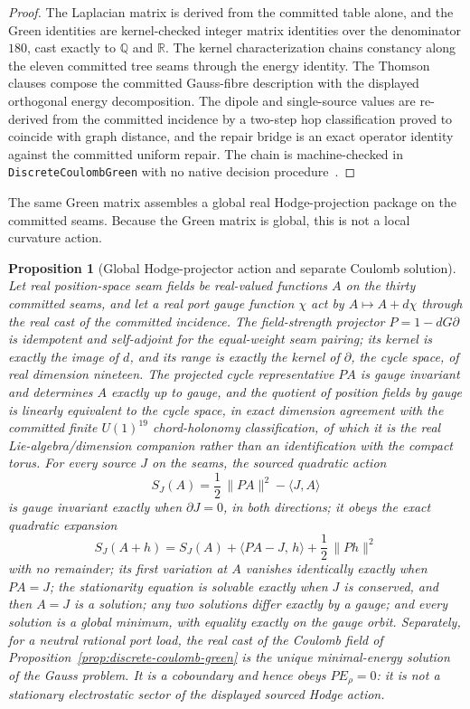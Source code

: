 \documentclass[11pt]{article}
\newtheorem{proposition}[theorem]{Proposition}
\theoremstyle{remark}
\theoremstyle{plain}
\begin{document}
\begin{proof}
The Laplacian matrix is derived from the committed table alone, and the
Green identities are kernel-checked integer matrix identities over the
denominator \(180\), cast exactly to \(\mathbb Q\) and \(\mathbb R\).
The kernel characterization chains constancy along the eleven committed
tree seams through the energy identity. The Thomson clauses compose the
committed Gauss-fibre description with the displayed orthogonal energy
decomposition. The dipole and single-source values are re-derived from
the committed incidence by a two-step hop classification proved to
coincide with graph distance, and the repair bridge is an exact
operator identity against the committed uniform repair. The chain is
machine-checked in \texttt{DiscreteCoulombGreen} with no native decision
procedure~\cite{ophrepo}.
\end{proof}

The same Green matrix assembles a global real Hodge-projection package on
the committed seams. Because the Green matrix is global, this is not a
local curvature action.

\begin{proposition}[Global Hodge-projector action and separate Coulomb solution]
\label{prop:position-space-maxwell-action}
Let real position-space seam fields be real-valued functions \(A\) on
the thirty committed seams, and let a real port gauge function \(\chi\)
act by \(A\mapsto A+d\chi\) through the real cast of the committed
incidence. The field-strength projector \(P=1-dG\partial\) is
idempotent and self-adjoint for the equal-weight seam pairing; its
kernel is exactly the image of \(d\), and its range is exactly the
kernel of \(\partial\), the cycle space, of real dimension nineteen.
The projected cycle representative \(PA\) is gauge invariant and determines \(A\)
exactly up to gauge, and the quotient of position fields by gauge is
linearly equivalent to the cycle space, in exact dimension agreement
with the committed finite \(U(1)^{19}\) chord-holonomy classification,
of which it is the real Lie-algebra/dimension companion rather than an
identification with the compact torus. For every source \(J\) on
the seams, the sourced quadratic action
\[
S_J(A)=\frac12\,\|PA\|^2-\langle J,A\rangle
\]
is gauge invariant exactly when \(\partial J=0\), in both directions;
it obeys the exact quadratic expansion
\[
S_J(A+h)=S_J(A)+\langle PA-J,\,h\rangle+\frac12\,\|Ph\|^2
\]
with no remainder; its first variation at \(A\) vanishes identically
exactly when \(PA=J\); the stationarity equation is solvable exactly
when \(J\) is conserved, and then \(A=J\) is a solution; any two
solutions differ exactly by a gauge; and every solution is a global
minimum, with equality exactly on the gauge orbit. Separately, for a neutral
rational port load, the real cast of the Coulomb field of
Proposition~\ref{prop:discrete-coulomb-green} is the unique
minimal-energy solution of the Gauss problem. It is a coboundary and hence
obeys \(P E_\rho=0\): it is not a stationary electrostatic sector of the
displayed sourced Hodge action.
\end{proposition}
\end{document}
